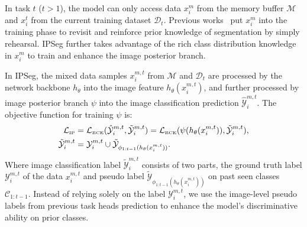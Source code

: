 In task \( t \) (\( t > 1 \)), the model can only access data \( x^{m}_i \) from the memory buffer \(\mathcal{M}\) and \( x^{t}_i \) from the current training dataset \(\mathcal{D}_t\). Previous works~\cite{SSUL_cha2021ssul, coinseg_zhang2023coinseg} put \( x^{m}_i \) into the training phase to revisit and reinforce prior knowledge of segmentation by simply rehearsal. IPSeg further takes advantage of the rich class distribution knowledge in \( x^{m}_i \) to train and enhance the image posterior branch.

In IPSeg, the mixed data samples \( x^{m,t}_i \) from  \(\mathcal{M}\) and \(\mathcal{D}_t\) are processed by the network backbone \( h_{\theta} \) into the image feature \( h_{\theta}(x^{m,t}_i) \), and further processed by image posterior branch \(\psi\) into the image classification prediction \(\hat{\mathcal{Y}}_i^{m,t}\). The objective function for training $\psi$ is: 
\vspace{-5pt}
\begin{equation}
    \begin{aligned}
        \mathcal{L}_{\text{\tiny IP}} &= \mathcal{L}_{\text{\tiny BCE}}(\hat{\mathcal{Y}}^{m,t}_i, \tilde{\mathcal{Y}}^{m,t}_i) = \mathcal{L}_{\text{\tiny BCE}}(\psi(h_\theta(x^{m,t}_i)), \tilde{\mathcal{Y}}^{m,t}_i), \\
        \tilde{\mathcal{Y}}^{m,t}_i &= \mathcal{Y}^{m,t}_i \cup \tilde{\mathcal{Y}}_{\phi_{1:t-1}(h_\theta(x^{m,t}_i))}.
    \end{aligned}
\end{equation}
Where image classification label \(\tilde{\mathcal{Y}}^{m,t}_i\) consists of two parts, the ground truth label \(\mathcal{Y}^{m,t}_i\) of the data \( x^{m,t}_i \) and pseudo label \(\tilde{\mathcal{Y}}_{\phi_{1:t-1}(h_\theta(x^{m,t}_i))}\) on past seen classes $\mathcal{C}_{1:t-1}$. 
Instead of relying solely on the label \(\mathcal{Y}^{m,t}_i\), we use the image-level pseudo labels from previous task heads prediction to enhance the model's discriminative ability on prior classes.



